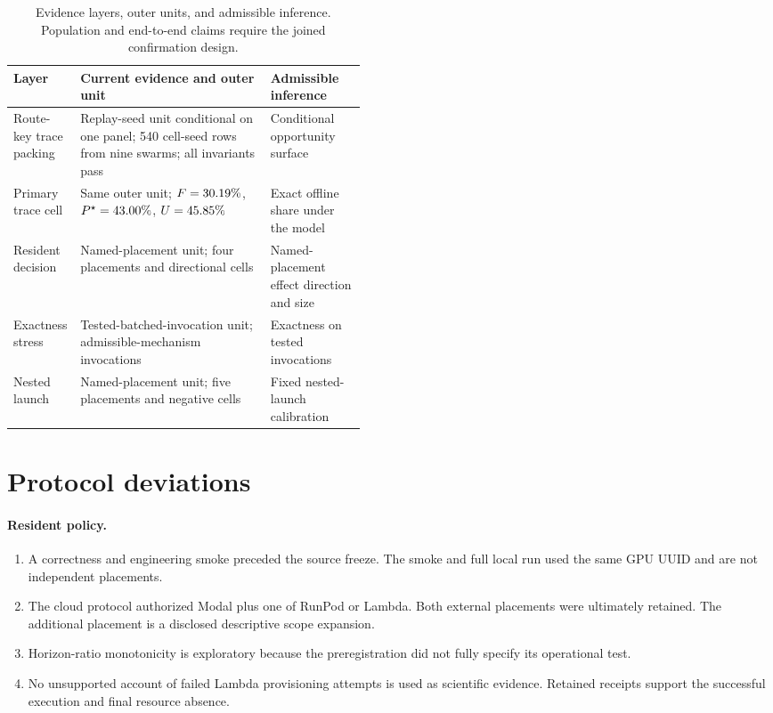 \begin{table}[htbp]
  \centering
  \footnotesize
  \begin{tabularx}{\linewidth}{@{}p{0.19\linewidth} X p{0.27\linewidth}@{}}
    \toprule
    Layer & Current evidence and outer unit & Admissible inference \\
    \midrule
    Route-key trace packing & Replay-seed unit conditional on one panel;
      540 cell-seed rows from nine swarms; all invariants pass & Conditional opportunity surface \\
    Primary trace cell & Same outer unit;
      $F=30.19\%$, $P^\star=43.00\%$, $U=45.85\%$ &
      Exact offline share under the model \\
    Resident decision & Named-placement unit; four placements and
      \ResidentCells{} directional cells & Named-placement effect direction and size \\
    Exactness stress & Tested-batched-invocation unit;
      \ResidentLegalInvocations{} admissible-mechanism invocations & Exactness on tested invocations \\
    Nested launch & Named-placement unit; five placements and
      \NativeCells{} negative cells & Fixed nested-launch calibration \\
    \bottomrule
  \end{tabularx}
  \caption{Evidence layers, outer units, and admissible inference. Population
  and end-to-end claims require the joined confirmation design.}
  \label{tab:evidence-inventory}
\end{table}

\section{Protocol deviations}
\label{app:deviations}

\paragraph{Resident policy.}

\begin{enumerate}
  \item A correctness and engineering smoke preceded the source freeze. The
  smoke and full local run used the same GPU UUID and are not independent
  placements.
  \item The cloud protocol authorized Modal plus one of RunPod or Lambda. Both
  external placements were ultimately retained. The additional placement is a
  disclosed descriptive scope expansion.
  \item Horizon-ratio monotonicity is exploratory because the preregistration
  did not fully specify its operational test.
  \item No unsupported account of failed Lambda provisioning attempts is used
  as scientific evidence. Retained receipts support the successful execution
  and final resource absence.
\end{enumerate}

